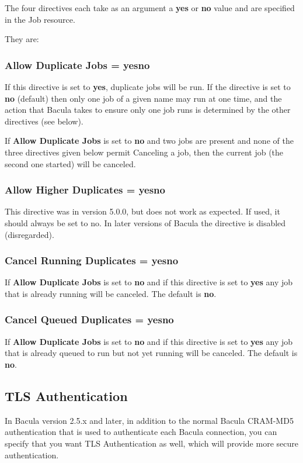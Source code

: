 The four directives each take as an argument a {\bf yes} or {\bf no} value and
are specified in the Job resource.

They are:

\subsubsection{Allow Duplicate Jobs = \lt{}yes\vb{}no\gt{}}
  If this directive is set to {\bf yes}, duplicate jobs will be run.  If
  the directive is set to {\bf no} (default) then only one job of a given name
  may run at one time, and the action that Bacula takes to ensure only
  one job runs is determined by the other directives (see below).
 
  If {\bf Allow Duplicate Jobs} is set to {\bf no} and two jobs
  are present and none of the three directives given below permit
  Canceling a job, then the current job (the second one started)
  will be canceled.

\subsubsection{Allow Higher Duplicates = \lt{}yes\vb{}no\gt{}}
  This directive was in version 5.0.0, but does not work as
  expected. If used, it should always be set to no.  In later versions
  of Bacula the directive is disabled (disregarded).

\subsubsection{Cancel Running Duplicates = \lt{}yes\vb{}no\gt{}}
  If {\bf Allow Duplicate Jobs} is set to {\bf no} and
  if this directive is set to {\bf yes} any job that is already running
  will be canceled.  The default is {\bf no}.

\subsubsection{Cancel Queued Duplicates = \lt{}yes\vb{}no\gt{}}
  If {\bf Allow Duplicate Jobs} is set to {\bf no} and
  if this directive is set to {\bf yes} any job that is
  already queued to run but not yet running will be canceled.
  The default is {\bf no}. 


\subsection{TLS Authentication}
In Bacula version 2.5.x and later, in addition to the normal Bacula
CRAM-MD5 authentication that is used to authenticate each Bacula
connection, you can specify that you want TLS Authentication as well,
which will provide more secure authentication.

